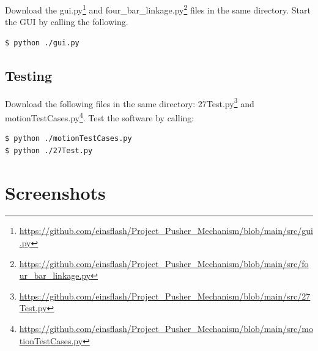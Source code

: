 \documentclass{article}
\begin{document}
Download the gui.py\footnote{\url{https://github.com/einsflash/Project_Pusher_Mechanism/blob/main/src/gui.py}} and four\_bar\_linkage.py\footnote{\url{https://github.com/einsflash/Project_Pusher_Mechanism/blob/main/src/four_bar_linkage.py}} files in the same directory. Start the GUI by calling the following.

\begin{lstlisting}[language=bash]
$ python ./gui.py
\end{lstlisting}

\subsection{Testing}

Download the following files in the same directory: 27Test.py\footnote{\url{https://github.com/einsflash/Project_Pusher_Mechanism/blob/main/src/27Test.py}} and motionTestCases.py\footnote{\url{https://github.com/einsflash/Project_Pusher_Mechanism/blob/main/src/motionTestCases.py}}. Test the software by calling:

\begin{lstlisting}[language=bash]
$ python ./motionTestCases.py
$ python ./27Test.py
\end{lstlisting}


\section{Screenshots}
\end{document}
